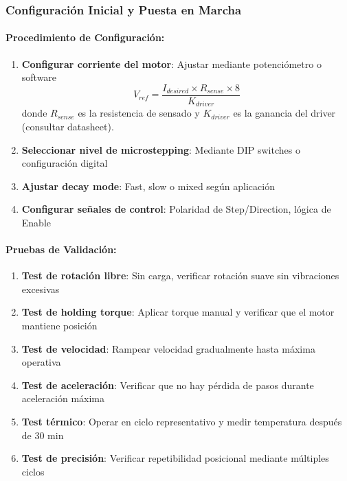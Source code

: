 \subsubsection{Configuración Inicial y Puesta en Marcha}

\paragraph{Procedimiento de Configuración:}

\begin{enumerate}
    \item \textbf{Configurar corriente del motor}: Ajustar mediante potenciómetro o software
    \begin{equation}
    V_{ref} = \frac{I_{desired} \times R_{sense} \times 8}{K_{driver}}
    \end{equation}
    donde $R_{sense}$ es la resistencia de sensado y $K_{driver}$ es la ganancia del driver (consultar datasheet).
    
    \item \textbf{Seleccionar nivel de microstepping}: Mediante DIP switches o configuración digital
    
    \item \textbf{Ajustar decay mode}: Fast, slow o mixed según aplicación
    
    \item \textbf{Configurar señales de control}: Polaridad de Step/Direction, lógica de Enable
\end{enumerate}

\paragraph{Pruebas de Validación:}

\begin{enumerate}
    \item \textbf{Test de rotación libre}: Sin carga, verificar rotación suave sin vibraciones excesivas
    
    \item \textbf{Test de holding torque}: Aplicar torque manual y verificar que el motor mantiene posición
    
    \item \textbf{Test de velocidad}: Rampear velocidad gradualmente hasta máxima operativa
    
    \item \textbf{Test de aceleración}: Verificar que no hay pérdida de pasos durante aceleración máxima
    
    \item \textbf{Test térmico}: Operar en ciclo representativo y medir temperatura después de 30 min
    
    \item \textbf{Test de precisión}: Verificar repetibilidad posicional mediante múltiples ciclos
\end{enumerate}


